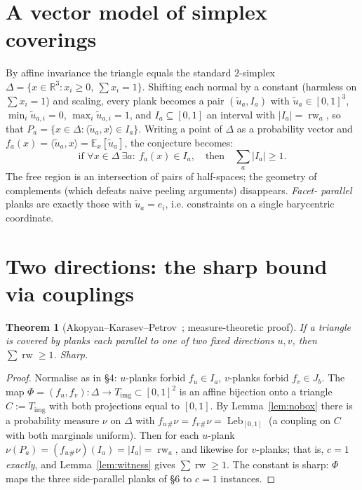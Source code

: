\documentclass[11pt]{article}
\theoremstyle{plain}
\newtheorem{theorem}{Theorem}
\theoremstyle{remark}
\newcommand{\rw}{\operatorname{rw}}
\newcommand{\Leb}{\operatorname{Leb}}
\newcommand{\R}{\mathbb{R}}
\begin{document}
\section{A vector model of simplex coverings}

By affine invariance the triangle equals the standard $2$-simplex
$\Delta=\{x\in\R^3:x_i\ge0,\ \sum x_i=1\}$. Shifting each normal by a constant
(harmless on $\sum x_i=1$) and scaling, every plank becomes a pair
$(\tilde u_a, I_a)$ with $\tilde u_a\in[0,1]^3$, $\min_i\tilde u_{a,i}=0$,
$\max_i\tilde u_{a,i}=1$, and $I_a\subseteq[0,1]$ an interval with $|I_a|=\rw_a$,
so that $P_a=\{x\in\Delta:\langle\tilde u_a,x\rangle\in I_a\}$. Writing a point of
$\Delta$ as a probability vector and $f_a(x)=\langle\tilde u_a,x\rangle=
\mathbb E_x[\tilde u_a]$, the conjecture becomes:
\[
  \text{if } \forall x\in\Delta\ \exists a:\ f_a(x)\in I_a,\quad\text{then}\quad
  \sum_a |I_a|\ge 1 .
\]
The free region is an intersection of pairs of half-spaces; the geometry of
complements (which defeats naive peeling arguments) disappears. \emph{Facet-%
parallel} planks are exactly those with $\tilde u_a=e_i$, i.e. constraints on a
single barycentric coordinate.

\section{Two directions: the sharp bound via couplings}

\begin{theorem}[Akopyan--Karasev--Petrov~\cite{akp2019}; measure-theoretic proof]
\label{thm:two}
If a triangle is covered by planks each parallel to one of two fixed directions
$u,v$, then $\sum\rw\ge1$. Sharp.
\end{theorem}
\begin{proof}
Normalise as in \S4: $u$-planks forbid $f_u\in I_a$, $v$-planks forbid
$f_v\in J_b$. The map $\Phi=(f_u,f_v):\Delta\to T_{\mathrm{img}}\subset[0,1]^2$
is an affine bijection onto a triangle $C:=T_{\mathrm{img}}$ with both projections
equal to $[0,1]$. By Lemma~\ref{lem:nobox} there is a probability measure $\nu$ on
$\Delta$ with $f_u{}_\#\nu=f_v{}_\#\nu=\Leb_{[0,1]}$ (a coupling on $C$ with both
marginals uniform). Then for each $u$-plank
$\nu(P_a)=(f_u{}_\#\nu)(I_a)=|I_a|=\rw_a$, and likewise for $v$-planks; that is,
$c=1$ \emph{exactly}, and Lemma~\ref{lem:witness} gives $\sum\rw\ge1$. The constant
is sharp: $\Phi$ maps the three side-parallel planks of \S6 to $c=1$ instances.
\end{proof}
\end{document}
